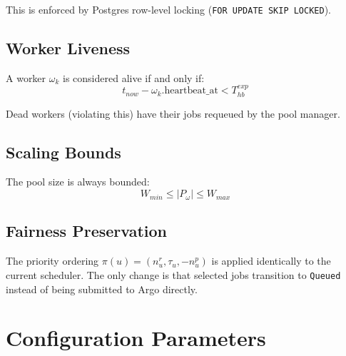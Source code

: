 \documentclass[11pt]{article}
\begin{document}
This is enforced by Postgres row-level locking (\texttt{FOR UPDATE SKIP LOCKED}).

\subsection{Worker Liveness}

A worker $\omega_k$ is considered alive if and only if:
\begin{equation}
t_{now} - \omega_k.\text{heartbeat\_at} < T_{hb}^{exp}
\end{equation}

Dead workers (violating this) have their jobs requeued by the pool manager.

\subsection{Scaling Bounds}

The pool size is always bounded:
\begin{equation}
W_{min} \leq |P_\omega| \leq W_{max}
\end{equation}

\subsection{Fairness Preservation}

The priority ordering $\pi(u) = (n_u^r, \tau_u, -n_u^p)$ is applied identically to
the current scheduler. The only change is that selected jobs transition to
\texttt{Queued} instead of being submitted to Argo directly.


\section{Configuration Parameters}
\end{document}
